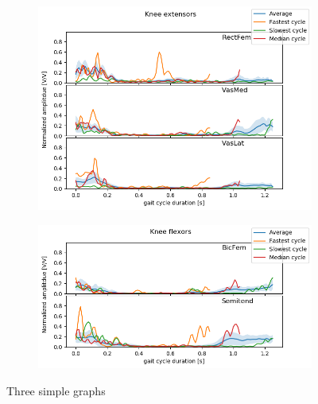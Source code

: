 \documentclass[../main.tex]{subfiles}
\begin{document}
\begin{figure}
     \centering
     \begin{subfigure}[b]{0.6\textwidth}
         \centering
         \includegraphics[width=\textwidth]{img/results/norm_emg_knee_ext.png}
     \end{subfigure}
     \hfill
     \begin{subfigure}[b]{0.6\textwidth}
         \centering
         \includegraphics[width=\textwidth]{img/results/norm_emg_knee_flex.png}
     \end{subfigure}
    \caption{Three simple graphs}
    \label{fig:emg-to-moment-representation}
\end{figure}
\end{document}
